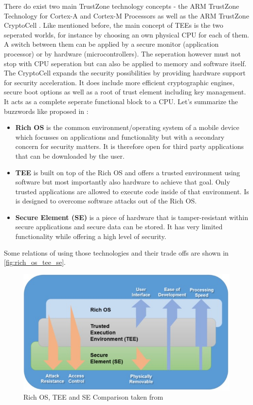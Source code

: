 There do exist two main TrustZone technology concepts - the ARM TrustZone Technology for Cortex-A and Cortex-M Processors as well as the ARM TrustZone CryptoCell \parencite{trustzone}. Like mentioned before, the main concept of TEEs is the two seperated worlds, for instance by choosing an own physical CPU for each of them. A switch between them can be applied by a secure monitor (application processor) or by hardware (microcontrollers). The seperation however must not stop with CPU seperation but can also be applied to memory and 
software itself. The CryptoCell expands the security possibilities by providing
hardware support for security acceleration. It does include more efficient 
cryptographic engines, secure boot options as well as a root of trust element including key management. It acts as a complete seperate functional block to a CPU. Let's summarize the buzzwords like proposed in \parencite{tee_guide}:

\begin{itemize}
\item \textbf{Rich OS} is the common environment/operating system of a mobile device which focusses on applications and functionality but with a secondary concern for security matters. It is therefore open for third party applications
that can be downloaded by the user.
\item \textbf{TEE} is built on top of the Rich OS and offers a trusted environment using software but most importantly also hardware to achieve that goal. Only trusted applications are allowed to execute code inside of that environment. Is is designed to overcome software attacks out of the Rich OS.
\item \textbf{Secure Element (SE)} is a piece of hardware that is tamper-resistant within secure applications and secure data can be stored. It has very limited functionality while offering a high level of security. 
\end{itemize}

Some relations of using those technologies and their trade offs are shown in \autoref{fig:rich_os_tee_se}.
\begin{figure}[htb]
  \centering
  \includegraphics[scale=0.6]{figures/rich_os_tee_se}
  \caption[Rich OS, TEE and SE Comparison]{Rich OS, TEE and SE Comparison taken from \parencite{tee_guide}}
  \label{fig:rich_os_tee_se}
\end{figure}



